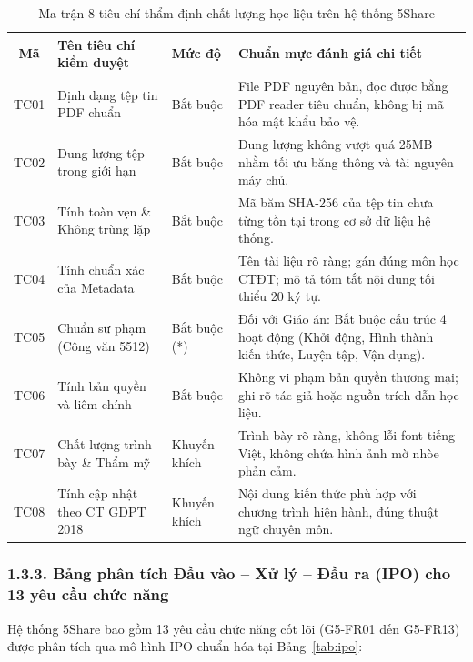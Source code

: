 \begin{table}[htbp]
\centering
\small
\caption{Ma trận 8 tiêu chí thẩm định chất lượng học liệu trên hệ thống 5Share}
\label{tab:criteria}
\begin{tabularx}{\textwidth}{|c|p{3.5cm}|p{1.8cm}|X|}
\hline
\textbf{Mã} & \textbf{Tên tiêu chí kiểm duyệt} & \textbf{Mức độ} & \textbf{Chuẩn mực đánh giá chi tiết} \\
\hline
TC01 & Định dạng tệp tin PDF chuẩn & Bắt buộc & File PDF nguyên bản, đọc được bằng PDF reader tiêu chuẩn, không bị mã hóa mật khẩu bảo vệ. \\
\hline
TC02 & Dung lượng tệp trong giới hạn & Bắt buộc & Dung lượng không vượt quá 25MB nhằm tối ưu băng thông và tài nguyên máy chủ. \\
\hline
TC03 & Tính toàn vẹn \& Không trùng lặp & Bắt buộc & Mã băm SHA-256 của tệp tin chưa từng tồn tại trong cơ sở dữ liệu hệ thống. \\
\hline
TC04 & Tính chuẩn xác của Metadata & Bắt buộc & Tên tài liệu rõ ràng; gán đúng môn học CTĐT; mô tả tóm tắt nội dung tối thiểu 20 ký tự. \\
\hline
TC05 & Chuẩn sư phạm (Công văn 5512) & Bắt buộc (*) & Đối với Giáo án: Bắt buộc cấu trúc 4 hoạt động (Khởi động, Hình thành kiến thức, Luyện tập, Vận dụng). \\
\hline
TC06 & Tính bản quyền và liêm chính & Bắt buộc & Không vi phạm bản quyền thương mại; ghi rõ tác giả hoặc nguồn trích dẫn học liệu. \\
\hline
TC07 & Chất lượng trình bày \& Thẩm mỹ & Khuyến khích & Trình bày rõ ràng, không lỗi font tiếng Việt, không chứa hình ảnh mờ nhòe phản cảm. \\
\hline
TC08 & Tính cập nhật theo CT GDPT 2018 & Khuyến khích & Nội dung kiến thức phù hợp với chương trình hiện hành, đúng thuật ngữ chuyên môn. \\
\hline
\end{tabularx}
\end{table}

\subsubsection{1.3.3. Bảng phân tích Đầu vào -- Xử lý -- Đầu ra (IPO) cho 13 yêu cầu chức năng}
Hệ thống 5Share bao gồm 13 yêu cầu chức năng cốt lõi (G5-FR01 đến G5-FR13) được phân tích qua mô hình IPO chuẩn hóa tại Bảng~\ref{tab:ipo}:


